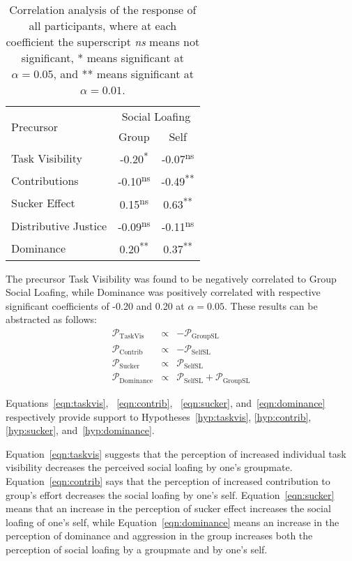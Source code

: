 \documentclass[a4paper,a4paper,BCOR12mm,12pt,abstracton,pointednumbers,tablecaptionabove,footinclude,halfparskip,normalheadings,]{scrartcl}
\newcommand{\PERCEPT}{\mathcal{P}}
\newcommand{\SELFSL}{\mathrm{SelfSL}}
\newcommand{\GROUPSL}{\mathrm{GroupSL}}
\newcommand{\TASKVIS}{\mathrm{TaskVis}}
\newcommand{\CONTRIB}{\mathrm{Contrib}}
\newcommand{\DOMINANCE}{\mathrm{Dominance}}
\newcommand{\SUCKER}{\mathrm{Sucker}}
\begin{document}
\begin{table}[hbt]
\caption{Correlation analysis of the response of all participants, where at each coefficient the superscript {\em ns} means not significant, * means significant at $\alpha=0.05$, and ** means significant at $\alpha=0.01$.}\label{tab:cor-all}
\centering\begin{tabular}{lcc}
\hline\hline
\multirow{2}{*}{Precursor} & \multicolumn{2}{c}{Social Loafing}\\
\cline{2-3}
                           & Group & Self \\
\hline
Task Visibility & -0.20\textsuperscript{*}  & -0.07\textsuperscript{ns} \\
Contributions   & -0.10\textsuperscript{ns} & -0.49\textsuperscript{**} \\
Sucker Effect   &  0.15\textsuperscript{ns} &  0.63\textsuperscript{**} \\
Distributive Justice & -0.09\textsuperscript{ns} & -0.11\textsuperscript{ns}\\
Dominance       &  0.20\textsuperscript{**} &  0.37\textsuperscript{**}\\
\hline\hline
\end{tabular}
\end{table}

The precursor Task Visibility was found to be negatively correlated to Group Social Loafing, while Dominance was positively correlated with respective significant coefficients of -0.20 and 0.20 at $\alpha=0.05$. These results can be abstracted as follows:
\begin{eqnarray}
 \PERCEPT_\TASKVIS & \propto & -\PERCEPT_\GROUPSL\\\label{eqn:taskvis}
 \PERCEPT_\CONTRIB & \propto & -\PERCEPT_\SELFSL\\\label{eqn:contrib}
 \PERCEPT_\SUCKER  & \propto & \PERCEPT_\SELFSL\\\label{eqn:sucker}
 \PERCEPT_\DOMINANCE & \propto & \PERCEPT_\SELFSL + \PERCEPT_\GROUPSL\label{eqn:dominance}
\end{eqnarray}

Equations~\ref{eqn:taskvis}, ~\ref{eqn:contrib}, ~\ref{eqn:sucker}, and~\ref{eqn:dominance} respectively provide support to Hypotheses~\ref{hyp:taskvis}, \ref{hyp:contrib}, \ref{hyp:sucker}, and~\ref{hyp:dominance}.

Equation~\ref{eqn:taskvis} suggests that the perception of increased individual task visibility decreases the perceived social loafing by one's groupmate. Equation~\ref{eqn:contrib} says that the perception of increased contribution to group's effort decreases the social loafing by one's self. Equation~\ref{eqn:sucker} means that an increase in the perception of sucker effect increases the social loafing of one's self, while Equation~\ref{eqn:dominance} means an increase in the perception of dominance and aggression in the group increases both the perception of social loafing by a groupmate and by one's self.
\end{document}
